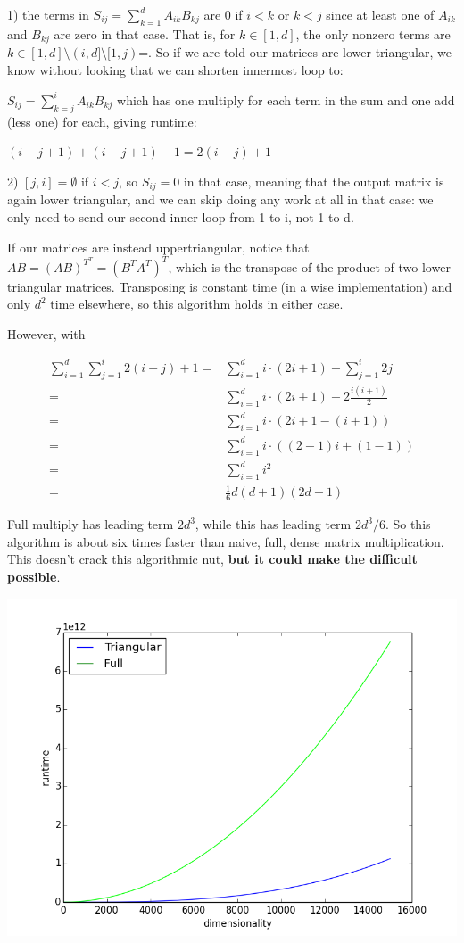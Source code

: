 \documentclass[english]{article}
\begin{document}
1) the terms in $S_{ij}=\sum_{k=1}^{d}A_{ik}B_{kj}$ are $0$ if $i<k$
or $k<j$ since at least one of $A_{ik}$ and $B_{kj}$ are zero in
that case. That is, for $k\in[1,d]$, the only nonzero terms are $k\in[1,d]\setminus(i,d]\setminus[1,j)$=.
So if we are told our matrices are lower triangular, we know without
looking that we can shorten innermost loop to:

$S_{ij}=\sum_{k=j}^{i}A_{ik}B_{kj}$ which has one multiply for each
term in the sum and one add (less one) for each, giving runtime:

$(i-j+1)+(i-j+1)-1=2(i-j)+1$

2) $[j,i]=\emptyset$ if $i<j$, so $S_{ij}=0$ in that case, meaning
that the output matrix is again lower triangular, and we can skip
doing any work at all in that case: we only need to send our second-inner
loop from 1 to i, not 1 to d.

If our matrices are instead uppertriangular, notice that $AB=(AB)^{T^{T}}=(B^{T}A^{T})^{T}$,
which is the transpose of the product of two lower triangular matrices.
Transposing is constant time (in a wise implementation) and only $d^{2}$
time elsewhere, so this algorithm holds in either case.

However, with

\begin{align*}
\sum_{i=1}^{d}\sum_{j=1}^{i}2(i-j)+1= & \sum_{i=1}^{d}i\cdot(2i+1)-\sum_{j=1}^{i}2j\\
= & \sum_{i=1}^{d}i\cdot(2i+1)-2\frac{i(i+1)}{2}\\
= & \sum_{i=1}^{d}i\cdot(2i+1-(i+1))\\
= & \sum_{i=1}^{d}i\cdot((2-1)i+(1-1))\\
= & \sum_{i=1}^{d}i^{2}\\
= & \frac{1}{6}d(d+1)(2d+1)
\end{align*}


Full multiply has leading term $2d^{3}$, while this has leading term
$2d^{3}/6$. So this algorithm is about six times faster than naive,
full, dense matrix multiplication. This doesn't crack this algorithmic
nut, \textbf{but it could make the difficult possible}.

\includegraphics[scale=0.7]{full_vs_triangular}
\end{document}
